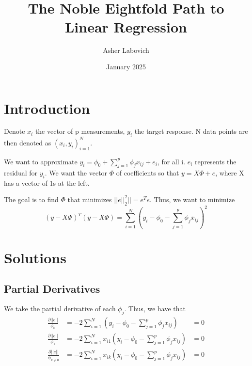 \documentclass{article}
\title{The Noble Eightfold Path to Linear Regression}
\author{Asher Labovich}
\date{January 2025}
\begin{document}
\maketitle 

\section{Introduction}
Denote $x_i$ the vector of p measurements, $y_i$ the target response. 
N data points are then denoted as $(x_i, y_i)_{i=1}^N$. 

We want to approximate $y_i = \phi_0 + \sum_{j=1}^p \phi_j x_{ij} + e_i$, for all i.
$e_i$ represents the residual for $y_i$. We want the vector $\Phi$ of coefficients
so that $y = X\Phi + e$, where X has a vector of 1s at the left.

The goal is to find $\Phi$ that minimizes $||e||_2^2|| = e^Te$. Thus, we want to minimize
\[
(y - X\Phi)^T(y - X\Phi) = \sum_{i=1}^N (y_i - \phi_0 - \sum_{j=1}^p \phi_j x_{ij})^2 
\]

\section{Solutions}

\subsection{Partial Derivatives}
We take the partial derivative of each $\phi_j$. Thus, we have that \begin{align*}
    \frac{\partial ||e||}{\phi_0} &= -2\sum_{i=1}^N (y_i - \phi_0 - \sum_{j=1}^p \phi_j x_{ij}) &= 0 \\
    \frac{\partial ||e||}{\phi_1} &= -2\sum_{i=1}^N x_{i1}(y_i - \phi_0 - \sum_{j=1}^p \phi_j x_{ij}) &= 0 \\
    \frac{\partial ||e||}{\phi_{k \neq 0}} &= -2\sum_{i=1}^N x_{ik}(y_i - \phi_0 - \sum_{j=1}^p \phi_j x_{ij}) &= 0
\end{align*}
\end{document}

